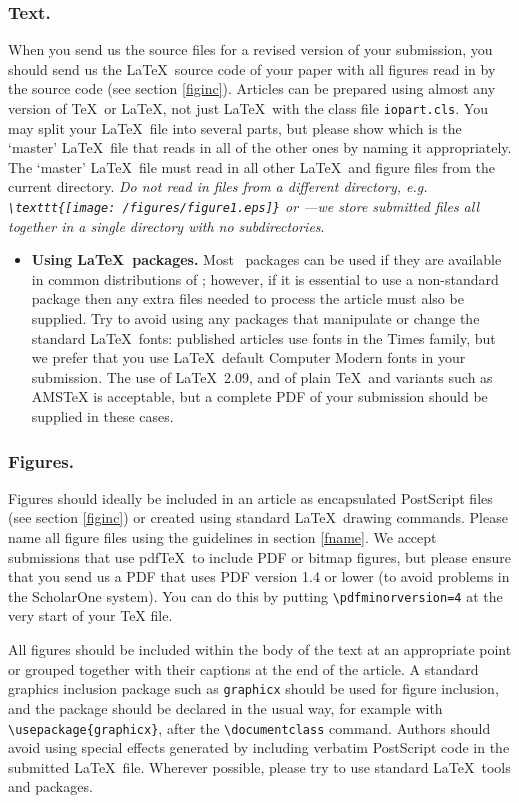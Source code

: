 \documentclass[12pt]{iopart}
\begin{document}
\subsubsection{Text.}When you send us the source files for a revised version of your submission,
you should send us the \LaTeX\ source code of your paper with all figures read in by 
the source code (see section \ref{figinc}).  Articles can be prepared using almost any version of \TeX\ or \LaTeX{},
not just \LaTeX\ with the class file \verb"iopart.cls".  You may split your \LaTeX\ file into several parts, but please show
which is the `master' \LaTeX\ file that reads in all of the other ones by naming it appropriately.  The `master'
\LaTeX\ file must read in all other \LaTeX\ and figure files from the current directory.  {\it Do not read in files from a different directory, e.g. \verb"\texttt{[image: /figures/figure1.eps]}" or
\verb""---we store submitted files
all together in a single directory with no subdirectories}.
\begin{itemize}
\item {\bf Using \LaTeX\ packages.} Most \LaTeXe\ packages can be used if they are 
available in common distributions of \LaTeXe; however, if it is essential to use 
a non-standard package then any extra files needed to process the article must 
also be supplied.  Try to avoid using any packages that manipulate or change the standard
\LaTeX\ fonts: published articles use fonts in the Times family, but we prefer that you 
use \LaTeX\ default Computer Modern fonts in your submission.  The use of \LaTeX\ 2.09, and of plain
\TeX\ and variants such as AMSTeX is acceptable, but a complete PDF of your submission should be supplied in these cases.
\end{itemize}
\subsubsection{Figures.} Figures should ideally be included in an article as encapsulated PostScript files
(see section \ref{figinc}) or created using standard \LaTeX\ drawing commands. 
 Please name all figure files using the guidelines in section \ref{fname}.
We accept submissions that use pdf\TeX\ to include
PDF or bitmap figures, but please ensure that you send us a PDF that uses PDF version 1.4 or lower
(to avoid problems in the ScholarOne system).
You can do this by putting \verb"\pdfminorversion=4" at the very start of your TeX file.

\label{fig1}All figures should be included within the body of the text 
at an appropriate point or grouped together with their captions at the end of the article. A standard graphics inclusion package such as \verb"graphicx" should be used for figure inclusion, and the package should be declared in the usual
way, for example with \verb"\usepackage{graphicx}", after the \verb"\documentclass" command.
Authors should avoid using special effects generated by including verbatim
PostScript code in the submitted \LaTeX\ file. Wherever possible, please try to use standard \LaTeX\ tools 
and packages.
\end{document}
